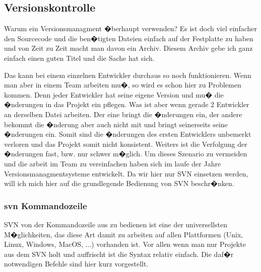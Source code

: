 
\subsection[Versionskontrolle]{Versionskontrolle}
Warum ein Versionsmanagment �berhaupt verwenden? Es ist doch viel einfacher den Sourcecode und die ben�tigten Dateien einfach auf der Festplatte zu haben und von Zeit zu Zeit macht man davon ein Archiv. Diesem Archiv gebe ich ganz einfach einen guten Titel und die Sache hat sich.

Das kann bei einem einzelnen Entwickler durchaus so noch funktionieren. Wenn man aber in einem Team arbeiten mu�, so wird es schon hier zu Problemen kommen. Denn jeder Entwickler hat seine eigene Version und mu� die �nderungen in das Projekt ein pflegen. Was ist aber wenn gerade 2 Entwickler an derselben Datei arbeiten. Der eine bringt die �nderungen ein, der andere bekommt die �nderung aber auch nicht mit und bringt seinerseits seine �nderungen ein. Somit sind die �nderungen des ersten Entwicklers unbemerkt verloren und das Projekt somit nicht konsistent. Weiters ist die Verfolgung der �nderungen fast, bzw. nur schwer m�glich. Um dieses Szenario zu vermeiden und die arbeit im Team zu vereinfachen haben sich im laufe der Jahre Versionsmanagmentsysteme entwickelt. Da wir hier nur SVN einsetzen werden, will ich mich hier auf die grundlegende Bedienung von SVN beschr�nken.

\subsubsection[svn Kommandozeile]{svn Kommandozeile}
SVN von der Kommandozeile aus zu bedienen ist eine der universellsten M�glichkeiten, das diese Art damit zu arbeiten auf allen Plattformen (Unix, Linux, Windows, MacOS, ...) vorhanden ist. Vor allen wenn man nur Projekte aus dem SVN holt und auffrischt ist die Syntax relativ einfach. Die daf�r notwendigen Befehle sind hier kurz vorgestellt.

